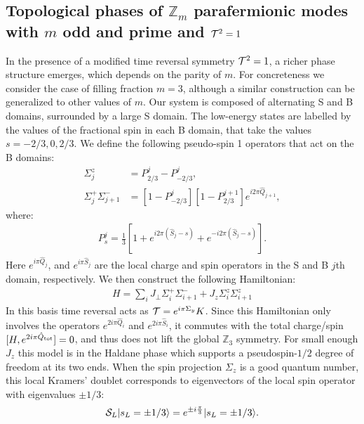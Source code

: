 \documentclass[twocolumn,aps,prb,showpacs]{revtex4-1}
\begin{document}
\subsection{Topological phases of $ \mathbb{Z}_m$ parafermionic modes with $m$ odd and prime and  $ {\cal T}^2=1$}



In the presence of a modified time reversal symmetry $ {\cal T}^2=1$, a richer phase structure emerges, which depends on {the parity of $m$.} For concreteness we consider the case of filling fraction $ m=3$, 
although a similar construction can be generalized to other values of $m$.
Our system is composed of alternating S and  B domains, surrounded by a large S domain. The low-energy states are labelled by the values of the fractional spin in each B domain, that take the values $s = -2/3,0,2/3 $. We define the following pseudo-spin 1 operators that act on the B domains:
\begin{align}
\Sigma_j^z &= P_{2/3}^j-P_{-2/3}^j,\\
\Sigma_j^+\Sigma_{j+1}^- &=\left[1-P_{-2/3}^j\right]\left[1-P_{2/3}^{j+1}\right]e^{i2\pi \hat{Q}_{j+1}},
\end{align}
where:
\begin{align}
P_s^j =\frac{1}{3}\left[ 1+ e^{i2\pi (\hat{S}_j-s)}+e^{-i2\pi (\hat{S}_j-s)}\right].
\end{align}
Here $ e^{i\pi \hat{Q}_j}$, and $ e^{i\pi \hat{S}_j}$ are the local charge and spin operators in the S and B $j$th domain, respectively. We then construct the following Hamiltonian:
\begin{align}
H = \sum_i J_\bot \Sigma_i^+\Sigma_{i+1}^- +J_z \Sigma_i^z \Sigma_{i+1}^z
\end{align}
In this basis time reversal acts as ${\cal T}=e^{i\pi \Sigma_y}K $.
Since this Hamiltonian only involves the operators  $e^{2i\pi \hat{Q}_i} $ and $ e^{2i\pi \hat{S}_i}$, it commutes with the total charge/spin $[H,e^{2i\pi \hat{Q}_{\rm tot}}]=0$, and thus does not lift the global $\mathbb{Z}_3$ symmetry.
For small enough $J_z$ this model is in the Haldane phase \cite{Haldane1983a,Haldane1983b} which supports a pseudospin-$1/2$ degree of freedom at its two ends. When the spin projection $\Sigma_z $ is a good quantum number, this local Kramers' doublet    corresponds to  eigenvectors of the local spin operator with  eigenvalues $\pm1/3 $:
\begin{align}
 {\cal S}_L |s_L = \pm1/3\rangle= e^{\pm i\frac{\pi}{3} }|s_L = \pm1/3\rangle.
\label{spinhalf}
\end{align}
\end{document}
